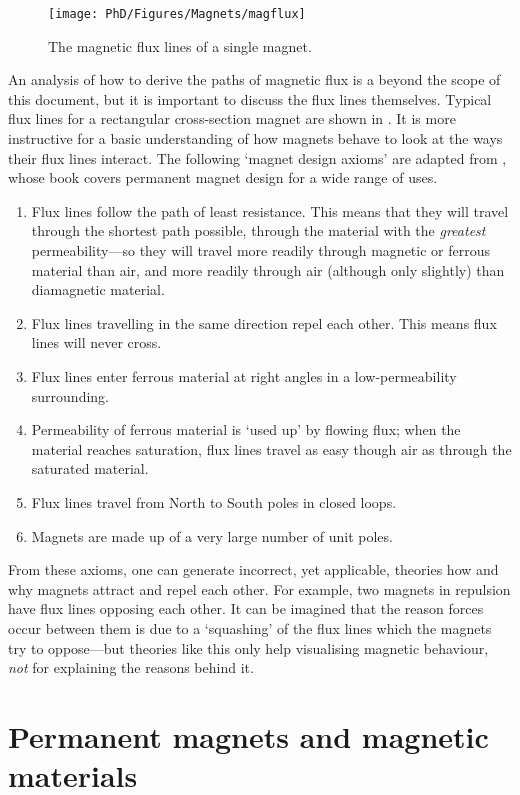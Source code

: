 \documentclass[11pt,a4paper]{memoir}
\begin{document}
\begin{figure}
\texttt{[image: PhD/Figures/Magnets/magflux]}
\caption{The magnetic flux lines of a single magnet.}
\end{figure}

An analysis of how to derive the paths of magnetic flux is a beyond the scope of this document, but it is important to discuss the flux lines themselves.
Typical flux lines for a rectangular cross-section magnet are shown in .
It is more instructive for a basic understanding of how magnets behave
to look at the ways their flux lines interact. The following `magnet
design axioms' are adapted from \textcite{moskowitz1995}, whose book
covers permanent magnet design for a wide range of uses.
\begin{enumerate}
\item Flux lines follow the path of least resistance. This means that they will
travel through the shortest path possible,
through the material with the
\emph{greatest} permeability---so they will travel more readily through
magnetic or ferrous material than air, and more readily through air
(although only slightly) than diamagnetic material.
\item Flux lines travelling in the same direction repel each other. This means
flux lines will never cross.
\item Flux lines enter ferrous material at right angles in a low-permeability surrounding.
\item Permeability of ferrous material is `used up' by flowing flux; when the
material reaches saturation, flux lines travel as easy though air as through
the saturated material.
\item Flux lines travel from North to South poles in closed loops.
\item Magnets are made up of a very large number of unit poles.
\end{enumerate}
From these axioms, one can generate incorrect, yet applicable,
theories how and why magnets attract and repel each other. For
example, two magnets in repulsion have flux lines opposing each
other.
It can be imagined that the reason forces occur between them is
due to a `squashing' of the flux lines which the magnets try to
oppose---but theories like this only help visualising magnetic
behaviour, \emph{not} for explaining the reasons behind it.

\section{Permanent magnets and magnetic materials}
\end{document}
